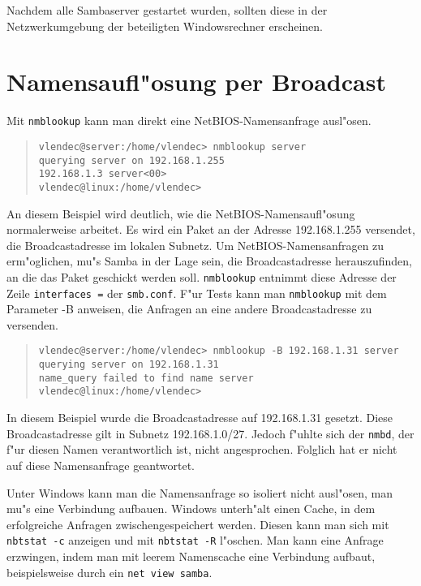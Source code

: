 \documentclass{scrartcl}
\newcommand{\prog}{\texttt}
\newcommand{\param}{\texttt}
\newcommand{\datei}{\texttt}
\begin{document}
Nachdem alle Sambaserver gestartet wurden, sollten diese in der
Netzwerkumgebung der beteiligten Windowsrechner erscheinen.

\section{Namensaufl"osung per Broadcast}

Mit \prog{nmblookup} kann man direkt eine NetBIOS-Namensanfrage
ausl"osen.

\begin{quote}
\begin{small}\begin{verbatim}
vlendec@server:/home/vlendec> nmblookup server
querying server on 192.168.1.255
192.168.1.3 server<00>
vlendec@linux:/home/vlendec>
\end{verbatim}\end{small}
\end{quote}
      
An diesem Beispiel wird deutlich, wie die NetBIOS-Namensaufl"osung
normalerweise arbeitet. Es wird ein Paket an der Adresse 192.168.1.255
versendet, die Broadcastadresse im lokalen Subnetz. Um
NetBIOS-Namensanfragen zu erm"oglichen, mu"s Samba in der Lage sein,
die Broadcastadresse herauszufinden, an die das Paket geschickt werden
soll.  \prog{nmblookup} entnimmt diese Adresse der Zeile
\param{interfaces =} der \datei{smb.conf}. F"ur Tests kann man
\prog{nmblookup} mit dem Parameter -B anweisen, die Anfragen an eine
andere Broadcastadresse zu versenden.

\begin{quote}
\begin{small}\begin{verbatim}
vlendec@server:/home/vlendec> nmblookup -B 192.168.1.31 server
querying server on 192.168.1.31
name_query failed to find name server
vlendec@linux:/home/vlendec>
\end{verbatim}\end{small}
\end{quote}

In diesem Beispiel wurde die Broadcastadresse auf 192.168.1.31
gesetzt. Diese Broadcastadresse gilt in Subnetz 192.168.1.0/27. Jedoch
f"uhlte sich der \prog{nmbd}, der f"ur diesen Namen verantwortlich
ist, nicht angesprochen. Folglich hat er nicht auf diese Namensanfrage
geantwortet.
      
Unter Windows kann man die Namensanfrage so isoliert nicht ausl"osen,
man mu"s eine Verbindung aufbauen. Windows unterh"alt einen Cache, in
dem erfolgreiche Anfragen zwischengespeichert werden. Diesen kann man
sich mit \prog{nbtstat -c} anzeigen und mit \prog{nbtstat -R} l"oschen.
Man kann eine Anfrage erzwingen, indem man mit leerem Namenscache eine
Verbindung aufbaut, beispielsweise durch ein \prog{net view
  samba}.
\end{document}

